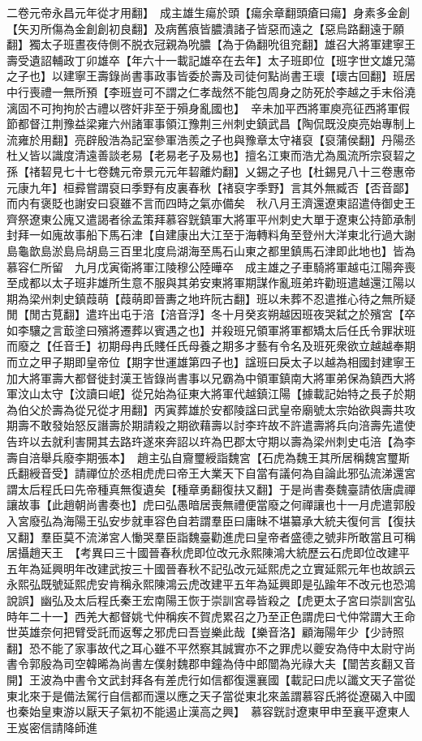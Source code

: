 二卷元帝永昌元年從才用翻】　成主雄生瘍於頭【瘍余章翻頭瘡曰瘍】身素多金創【矢刃所傷為金創創初良翻】及病舊㾗皆膿潰諸子皆惡而遠之【惡烏路翻遠于願翻】獨太子班晝夜侍側不脱衣冠親為吮膿【為于偽翻吮徂兖翻】雄召大將軍建寧王壽受遺詔輔政丁卯雄卒【年六十一載記雄卒在去年】太子班即位【班字世文雄兄蕩之子也】以建寧王壽錄尚書事政事皆委於壽及司徒何點尚書王瓌【瓌古回翻】班居中行喪禮一無所預【李班豈可不謂之仁孝哉然不能包周身之防死於李越之手末俗澆漓固不可拘拘於古禮以啓奸非至于殞身亂國也】　辛未加平西將軍庾亮征西將軍假節都督江荆豫益梁雍六州諸軍事領江豫荆三州刺史鎮武昌【陶侃既没庾亮始專制上流雍於用翻】亮辟殷浩為記室參軍浩羨之子也與豫章太守褚裒【裒蒲侯翻】丹陽丞杜乂皆以識度清遠善談老易【老易老子及易也】擅名江東而浩尤為風流所宗裒䂮之孫【禇䂮見七十七卷魏元帝景元元年䂮離灼翻】乂錫之子也【杜錫見八十三卷惠帝元康九年】桓彛嘗謂裒曰季野有皮裏春秋【禇裒字季野】言其外無臧否【否音鄙】而内有褒貶也謝安曰裒雖不言而四時之氣亦備矣　秋八月王濟還遼東詔遣侍御史王齊祭遼東公廆又遣謁者徐孟策拜慕容皝鎮軍大將軍平州刺史大單于遼東公持節承制封拜一如廆故事船下馬石津【自建康出大江至于海轉料角至登州大洋東北行過大謝島龜歆島淤島烏胡島三百里北度烏湖海至馬石山東之都里鎮馬石津即此地也】皆為慕容仁所留　九月戊寅衛將軍江陵穆公陸曄卒　成主雄之子車騎將軍越屯江陽奔喪至成都以太子班非雄所生意不服與其弟安東將軍期謀作亂班弟玝勸班遣越還江陽以期為梁州刺史鎮葭萌【葭萌即晉夀之地玝阮古翻】班以未葬不忍遣推心待之無所疑閒【閒古莧翻】遣玝出屯于涪【涪音浮】冬十月癸亥朔越因班夜哭弑之於殯宮【卒如李驤之言菆塗曰殯將遷葬以賓遇之也】并殺班兄領軍將軍都矯太后任氏令罪狀班而廢之【任音壬】初期母冉氏賤任氏母養之期多才藝有令名及班死衆欲立越越奉期而立之甲子期即皇帝位【期字世運雄第四子也】諡班曰戾太子以越為相國封建寧王加大將軍壽大都督徙封漢王皆錄尚書事以兄霸為中領軍鎮南大將軍弟保為鎮西大將軍汶山太守【汶讀曰岷】從兄始為征東大將軍代越鎮江陽【據載記始特之長子於期為伯父於壽為從兄從才用翻】丙寅葬雄於安都陵諡曰武皇帝廟號太宗始欲與壽共攻期壽不敢發始怒反譖壽於期請殺之期欲藉壽以討李玝故不許遣壽將兵向涪壽先遣使告玝以去就利害開其去路玝遂來奔詔以玝為巴郡太守期以壽為梁州刺史屯涪【為李壽自涪舉兵廢李期張本】　趙主弘自齎璽綬詣魏宮【石虎為魏王其所居稱魏宮璽斯氏翻綬音受】請禪位於丞相虎虎曰帝王大業天下自當有議何為自論此邪弘流涕還宮謂太后程氏曰先帝種真無復遺矣【種章勇翻復扶又翻】于是尚書奏魏臺請依唐虞禪讓故事【此趙朝尚書奏也】虎曰弘愚暗居喪無禮便當廢之何禪讓也十一月虎遣郭殷入宮廢弘為海陽王弘安步就車容色自若謂羣臣曰庸昧不堪纂承大統夫復何言【復扶又翻】羣臣莫不流涕宮人慟哭羣臣詣魏臺勸進虎曰皇帝者盛德之號非所敢當且可稱居攝趙天王　【考異曰三十國晉春秋虎即位改元永熙陳鴻大統歷云石虎即位改建平五年為延興明年改建武按三十國晉春秋不記弘改元延熙虎之立實延熙元年也故誤云永熙弘既號延熙虎安肯稱永熙陳鴻云虎改建平五年為延興即是弘踰年不改元也恐鴻說誤】幽弘及太后程氏秦王宏南陽王恢于崇訓宮尋皆殺之【虎更太子宮曰崇訓宮弘時年二十一】西羌大都督姚弋仲稱疾不賀虎累召之乃至正色謂虎曰弋仲常謂大王命世英雄奈何把臂受託而返奪之邪虎曰吾豈樂此哉【樂音洛】顧海陽年少【少詩照翻】恐不能了家事故代之耳心雖不平然察其誠實亦不之罪虎以夔安為侍中太尉守尚書令郭殷為司空韓晞為尚書左僕射魏郡申鐘為侍中郎闓為光祿大夫【闓苦亥翻又音開】王波為中書令文武封拜各有差虎行如信都復還襄國【載記曰虎以讖文天子當從東北來于是備法駕行自信都而還以應之天子當從東北來盖謂慕容氏將從遼碣入中國也秦始皇東游以厭天子氣初不能遏止漢高之興】　慕容皝討遼東甲申至襄平遼東人王岌密信請降師進